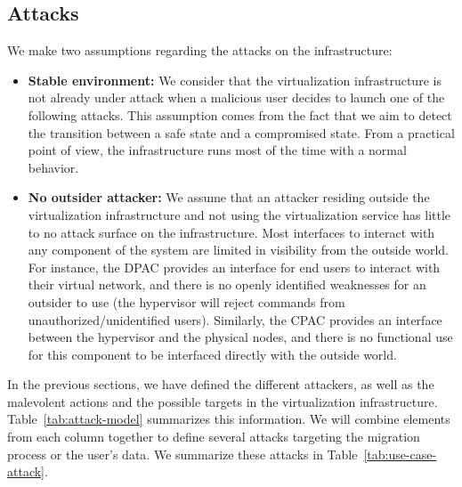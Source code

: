 \subsection{Attacks}
\label{sec:model-attacks}
We make two assumptions regarding the attacks on the infrastructure:

\begin{itemize}
    \item \textbf{Stable environment: } We consider that the virtualization infrastructure is not already under attack when a malicious user decides to launch one of the following attacks.
This assumption comes from the fact that we aim to detect the transition between a safe state and a compromised state. From a practical point of view, the infrastructure runs most of the time with a normal behavior.

    \item \textbf{No outsider attacker: } We assume that an attacker residing outside the virtualization infrastructure and not using the virtualization service has little to no attack surface on the infrastructure.
Most interfaces to interact with any component of the system are limited in visibility from the outside world.
For instance, the DPAC provides an interface for end users to interact with their virtual network, and there is no openly identified weaknesses for an outsider to use (\ie the hypervisor will reject commands from unauthorized/unidentified users).
Similarly, the CPAC provides an interface between the hypervisor and the physical nodes, and there is no functional use for this component to be interfaced directly with the outside world.
\end{itemize}

In the previous sections, we have defined the different attackers, as well as the malevolent actions and the possible targets in the virtualization infrastructure. 
Table~\ref{tab:attack-model} summarizes this information.
We will combine elements from each column together to define several attacks targeting the migration process or the user's data.
We summarize these attacks in Table~\ref{tab:use-case-attack}.

